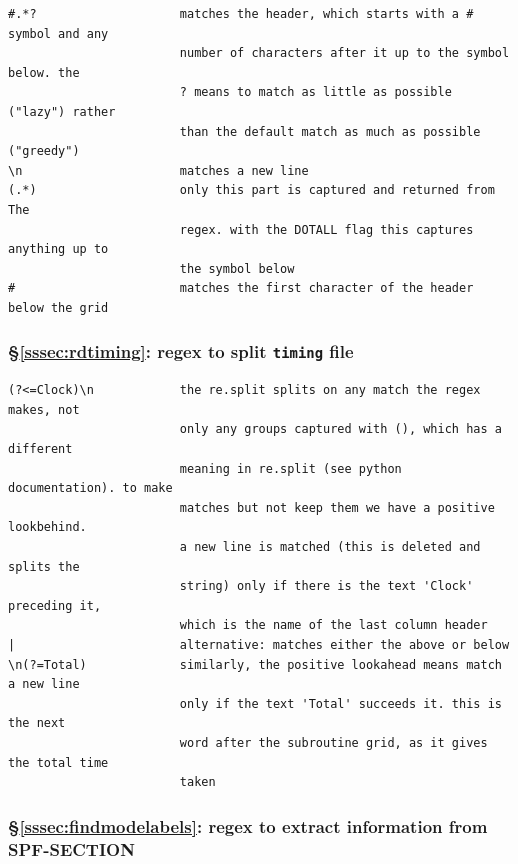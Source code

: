 \documentclass[12pt]{article}
\newenvironment{code}{\captionsetup{type=listing}}{\par\addvspace{\baselineskip}}
\begin{document}
\begin{code}\begin{verbatim}
#.*?                    matches the header, which starts with a # symbol and any
                        number of characters after it up to the symbol below. the
                        ? means to match as little as possible ("lazy") rather 
                        than the default match as much as possible ("greedy")
\n                      matches a new line
(.*)                    only this part is captured and returned from The
                        regex. with the DOTALL flag this captures anything up to
                        the symbol below
#                       matches the first character of the header below the grid
\end{verbatim}
\end{code}

\subsubsection*{\S\ref{sssec:rdtiming}: regex to split \texttt{timing} file}

\begin{code}\begin{verbatim}
(?<=Clock)\n            the re.split splits on any match the regex makes, not
                        only any groups captured with (), which has a different
                        meaning in re.split (see python documentation). to make
                        matches but not keep them we have a positive lookbehind.
                        a new line is matched (this is deleted and splits the
                        string) only if there is the text 'Clock' preceding it,
                        which is the name of the last column header
|                       alternative: matches either the above or below
\n(?=Total)             similarly, the positive lookahead means match a new line
                        only if the text 'Total' succeeds it. this is the next
                        word after the subroutine grid, as it gives the total time
                        taken
\end{verbatim}
\end{code}

\subsubsection*{\S\ref{sssec:findmodelabels}: regex to extract information from SPF-SECTION}
\end{document}
